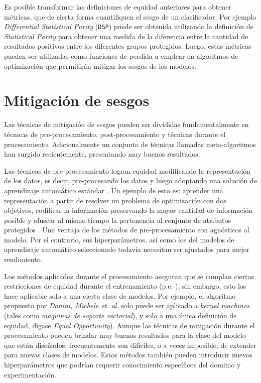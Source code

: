 Es posible transformar las definiciones de equidad anteriores para obtener métricas, que de cierta forma cuantifiquen el sesgo de un clasificador.
Por ejemplo \emph{Differential Statistical Parity} (\texttt{DSP}) puede ser obtenida utilizando la definición de \emph{Statistical Parity} para obtener una medida de la diferencia entre la cantidad de resultados positivos entre los diferentes grupos protegidos.
Luego, estas métricas pueden ser utilizadas como funciones de perdida a emplear en algoritmos de optimización que permitirán mitigar los sesgos de los modelos.

\section{Mitigación de sesgos}\label{section:mitigation}


Las técnicas de mitigación de sesgos pueden ser divididas fundamentalmente en técnicas de pre-procesamiento, post-procesamiento y técnicas durante el procesamiento. Adicionalmente un conjunto de técnicas llamadas meta-algoritmos han surgido recientemente, presentando muy buenos resultados.

Las técnicas de pre-procesamiento logran equidad modificando la representación de los datos, es decir, pre-procesando los datos y luego adoptando una solución de aprendizaje automático estándar \parencite{nips2017preproc, Kamiran2011DataPT, zemel2013learning}.
Un ejemplo de esto es: aprender una representación a partir de resolver un problema de optimización con dos objetivos, codificar la información preservando la mayor cantidad de información posible y ofuscar al mismo tiempo la pertenencia al conjunto de atributos protegidos \parencite{zemel2013learning}.
Una ventaja de los métodos de pre-procesamiento son agnósticos al modelo.
Por el contrario, sus hiperparámetros, así como los del modelos de aprendizaje automático seleccionado todavía necesitan ser ajustados para mejor rendimiento.

Los métodos aplicados durante el procesamiento aseguran que se cumplan ciertas restricciones de equidad durante el entrenamiento (p.e. \parencite{donini2018empirical, zafar2017fairness, zafar2019fairness}), sin embargo, esto los hace aplicable solo a una cierta clase de modelos.
Por ejemplo, el algoritmo propuesto por \emph{Donini, Michele et. al.} \parencite{donini2018empirical} solo puede ser aplicado a \emph{kernel machines} (tales como \emph{maquinas de soporte vectorial}), y solo a una única definición de equidad, dígase \emph{Equal Opportunity}).
Aunque las técnicas de mitigación durante el procesamiento pueden brindar muy buenos resultados para la clase del modelo que están diseñados, frecuentemente son difíciles, o a veces imposible, de extender para nuevas clases de modelos.
Estos métodos también pueden introducir nuevos hiperparámetros que podrían requerir conocimiento específicos del dominio y experimentación.

